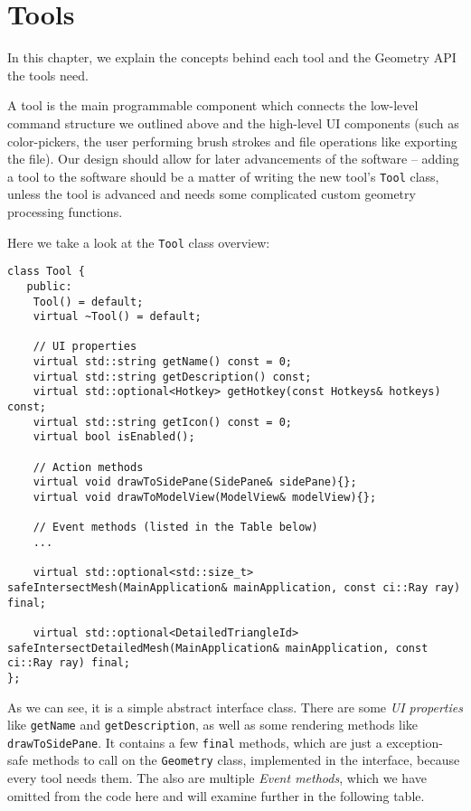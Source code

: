 \chapter{Tools}

In this chapter, we explain the concepts behind each tool and the Geometry API the tools need.

A tool is the main programmable component which connects the low-level command structure we outlined above and the high-level UI components (such as color-pickers, the user performing brush strokes and file operations like exporting the file). Our design should allow for later advancements of the software -- adding a tool to the software should be a matter of writing the new tool's \texttt{Tool} class, unless the tool is advanced and needs some complicated custom geometry processing functions.

\medskip

Here we take a look at the \texttt{Tool} class overview:

\begin{lstlisting}
class Tool {
   public:
    Tool() = default;
    virtual ~Tool() = default;

    // UI properties
    virtual std::string getName() const = 0;
    virtual std::string getDescription() const;
    virtual std::optional<Hotkey> getHotkey(const Hotkeys& hotkeys) const;
    virtual std::string getIcon() const = 0;
    virtual bool isEnabled();

    // Action methods
    virtual void drawToSidePane(SidePane& sidePane){};
    virtual void drawToModelView(ModelView& modelView){};

	// Event methods (listed in the Table below)
	...

    virtual std::optional<std::size_t> safeIntersectMesh(MainApplication& mainApplication, const ci::Ray ray) final;

    virtual std::optional<DetailedTriangleId> safeIntersectDetailedMesh(MainApplication& mainApplication, const ci::Ray ray) final;
};
\end{lstlisting}

As we can see, it is a simple abstract interface class. There are some \textit{UI properties} like \texttt{getName} and \texttt{getDescription}, as well as some rendering methods like \texttt{drawToSidePane}. It contains a few \texttt{final} methods, which are just a exception-safe methods to call on the \texttt{Geometry} class, implemented in the interface, because every tool needs them. The also are multiple \textit{Event methods}, which we have omitted from the code here and will examine further in the following table.

